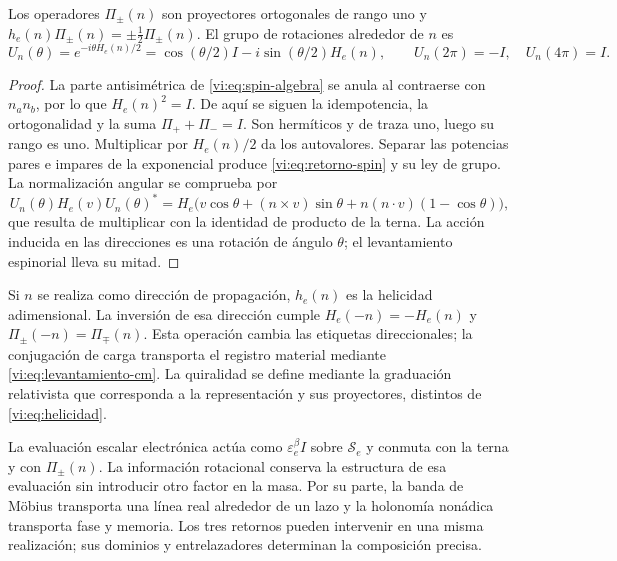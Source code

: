 \begin{proposition}
\label{vi:prop:helicidad}
Los operadores $\Pi_\pm(n)$ son proyectores ortogonales de
rango uno y $h_e(n)\Pi_\pm(n)=\pm\tfrac12\Pi_\pm(n)$.
El grupo de rotaciones alrededor de $n$ es
\begin{equation}
 U_n(\theta)=e^{-i\theta H_e(n)/2}
 =\cos(\theta/2)I-i\sin(\theta/2)H_e(n),\qquad
 U_n(2\pi)=-I,\quad U_n(4\pi)=I.
 \label{vi:eq:retorno-spin}
\end{equation}
\end{proposition}
\begin{proof}
La parte antisimétrica de \eqref{vi:eq:spin-algebra} se anula
al contraerse con $n_an_b$, por lo que $H_e(n)^2=I$.
De aquí se siguen la idempotencia, la ortogonalidad y la suma
$\Pi_++\Pi_-=I$. Son hermíticos y de traza uno, luego su
rango es uno. Multiplicar por $H_e(n)/2$ da los autovalores.
Separar las potencias pares e impares de la exponencial produce
\eqref{vi:eq:retorno-spin} y su ley de grupo. La normalización
angular se comprueba por
\[
 U_n(\theta)H_e(v)U_n(\theta)^*
 =H_e\bigl(v\cos\theta+(n\times v)\sin\theta
       +n(n\cdot v)(1-\cos\theta)\bigr),
\]
que resulta de multiplicar con la identidad de producto de la
terna. La acción inducida en las direcciones es una rotación de
ángulo $\theta$; el levantamiento espinorial lleva su mitad.
\end{proof}

Si $n$ se realiza como dirección de propagación, $h_e(n)$ es
la helicidad adimensional. La inversión de esa dirección cumple
$H_e(-n)=-H_e(n)$ y $\Pi_\pm(-n)=\Pi_\mp(n)$.
Esta operación cambia las etiquetas direccionales; la conjugación
de carga transporta el registro material mediante
\eqref{vi:eq:levantamiento-cm}. La quiralidad se define mediante
la graduación relativista que corresponda a la representación y
sus proyectores, distintos de \eqref{vi:eq:helicidad}.

La evaluación escalar electrónica actúa como
$\varepsilon_e^\beta I$ sobre $\mathscr S_e$ y conmuta con
la terna y con $\Pi_\pm(n)$. La información rotacional conserva
la estructura de esa evaluación sin introducir otro factor en
la masa. Por su parte, la banda de Möbius transporta una línea
real alrededor de un lazo y la holonomía nonádica transporta
fase y memoria. Los tres retornos pueden intervenir en una
misma realización; sus dominios y entrelazadores determinan la
composición precisa.

